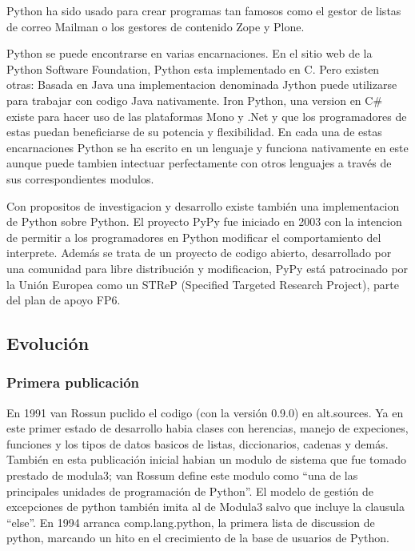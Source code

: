 \documentclass[a4paper,spanish,12pt]{book}
\begin{document}
Python ha sido usado para crear programas tan famosos como el gestor de listas de correo Mailman o los gestores de contenido Zope y Plone.

Python se puede encontrarse en varias encarnaciones. En el sitio web de la Python Software Foundation, Python esta implementado en C. Pero existen otras: Basada en Java una implementacion denominada Jython puede utilizarse para trabajar con codigo Java nativamente. Iron Python, una version en C\# existe para hacer uso de las plataformas Mono y .Net y que los programadores de estas puedan beneficiarse de su potencia y flexibilidad. En cada una de estas encarnaciones Python se ha escrito en un lenguaje y funciona nativamente en este aunque puede tambien intectuar perfectamente con otros lenguajes a trav\'es de sus correspondientes modulos.

Con propositos de investigacion y desarrollo existe tambi\'en una implementacion de Python sobre Python. El proyecto PyPy fue iniciado en 2003 con la intencion de permitir a los programadores en Python modificar el comportamiento del interprete. Además se trata de un proyecto de codigo abierto, desarrollado por una comunidad para libre distribución y modificacion, PyPy está patrocinado por la Unión Europea como un STReP (Specified Targeted Research Project), parte del plan de apoyo FP6.

\subsection{Evolución}

\subsubsection{Primera publicación}

En 1991 van Rossun puclido el codigo (con la versión 0.9.0) en alt.sources. Ya en este primer estado de desarrollo habia clases con herencias, manejo de expeciones, funciones y los tipos de datos basicos de listas, diccionarios, cadenas y demás. Tambi\'en en esta publicación inicial habian un modulo de sistema que fue tomado prestado de modula3; van Rossum define este modulo como ``una de las principales unidades de programación de Python''. El modelo de gestión de excepciones de python tambi\'en imita al de Modula3 salvo que incluye la clausula ``else''. En 1994 arranca comp.lang.python, la primera lista de discussion de python, marcando un hito en el crecimiento de la base de usuarios de Python.
\end{document}
